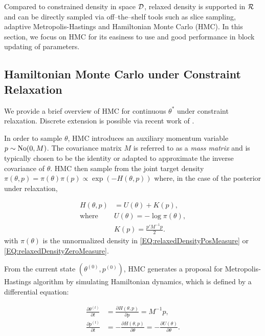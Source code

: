 \documentclass[10pt,fleqn]{article}
\DeclareMathOperator{\1}{\mathbbm{1}} \DeclareMathOperator{\bigO}{\mc O}
\newcommand{\mass}{M} %
\begin{document}
Compared to constrained density in  space $\mathcal{D}$, relaxed density is supported in $\mathcal{R}$ and can be directly
sampled via off--the--shelf tools such as slice
sampling, adaptive Metropolis-Hastings and Hamiltonian Monte Carlo (HMC).
In this section, we focus on HMC for its easiness to use and good
performance in block updating of parameters.

\subsection{Hamiltonian Monte Carlo under Constraint Relaxation}

We provide a brief overview of HMC for continuous $\theta^*$ under
constraint relaxation. Discrete extension is possible via recent work of
\cite{nishimura2017discontinuous}.

In order to sample $\theta$, HMC introduces an auxiliary momentum variable $p
\sim \No(0, \mass)$. The covariance matrix $\mass$ is referred to as a
\textit{mass matrix} and is typically chosen to be the identity or adapted
to approximate the inverse covariance of $\theta$. HMC then sample from the
joint target density $\pi(\theta, p) = \pi(\theta) \pi(p) \propto \exp (- H(\theta, p))$
where, in the case of the posterior under relaxation,


\begin{equation} \begin{aligned}
H(\theta, p) & = U(\theta)+K(p), \\ \text{where } &
U(\theta) = -\log\pi(\theta),    \\ & K(p) = \frac{p'\mass^{-1} p}{2}.
\end{aligned}
\end{equation}
with $\pi(\theta)$ is the unnormalized density in \eqref{EQ:relaxedDensityPosMeasure} or \eqref{EQ:relaxedDensityZeroMeasure}.

From the current state $(\theta^{(0)},p^{(0)})$, HMC generates a proposal for
Metropolis-Hastings algorithm by simulating Hamiltonian dynamics, which is
defined by a differential equation:

\begin{equation} \begin{aligned} \label{hamiltonian} \frac{\partial \theta
^{(t)}}{\partial t} & =\frac{\partial H(\theta, p)}{\partial p} =
\mass^{-1}p,                                                      \\ \frac{\partial p^{(t)}}{\partial t}&
=-\frac{\partial H(\theta, p)}{\partial \theta} = -\frac{\partial
U(\theta)}{\partial \theta}.\end{aligned} \end{equation}
\end{document}
